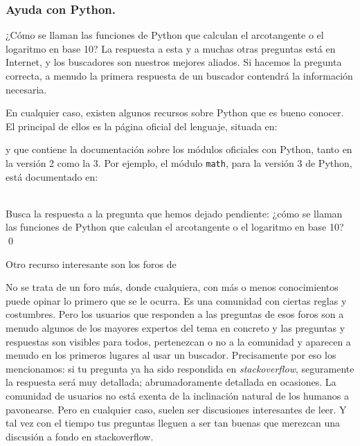\documentclass[10pt,a4paper]{article}\usepackage[]{graphicx}\usepackage[]{color}
\newcounter {cont01}
\begin{document}
\subsubsection*{Ayuda con Python.}
\label{tut02:subsubsec:ayudaPython}

¿Cómo se llaman las funciones de Python que calculan el arcotangente o el logaritmo en base 10? La respuesta a esta y a muchas otras preguntas está en Internet, y los buscadores son nuestros mejores aliados. Si hacemos la pregunta correcta, a menudo la primera respuesta de un buscador contendrá la información necesaria.

En cualquier caso, existen algunos recursos sobre Python que es bueno conocer. El principal de ellos es la página oficial del lenguaje, situada en:
\begin{center}
\end{center}
y que contiene la documentación sobre los módulos oficiales con Python, tanto en la versión 2 como la 3. Por ejemplo, el módulo {\tt math}, para la versión 3 de Python, está documentado en:
\begin{center}
\end{center}

\begin{ejercicio}
\label{tut02:ejercicio04}
\quad\\
Busca la respuesta a la pregunta que hemos dejado pendiente: ¿cómo se llaman las funciones de Python que calculan el arcotangente o el logaritmo en base 10?
\qed
\end{ejercicio}

Otro recurso interesante son los foros de
\begin{center}
\end{center}
No se trata de un foro más, donde cualquiera, con más o menos conocimientos puede opinar lo primero que se le ocurra. Es una comunidad con ciertas reglas y costumbres. Pero los usuarios que responden a las preguntas de esos foros son a menudo algunos de los mayores expertos del tema en concreto y las preguntas y respuestas son visibles para todos, pertenezcan o no a la comunidad y aparecen a menudo en los primeros lugares al usar un buscador. Precisamente por eso los mencionamos: si tu pregunta ya ha sido respondida en {\em stackoverflow}, seguramente la respuesta será muy detallada; abrumadoramente detallada en ocasiones. La comunidad de usuarios no está exenta de la inclinación natural de los humanos a pavonearse. Pero en cualquier caso, suelen ser discusiones interesantes de leer. Y tal vez con el tiempo tus preguntas lleguen a ser tan buenas que merezcan una discusión a fondo en stackoverflow.
\end{document}
